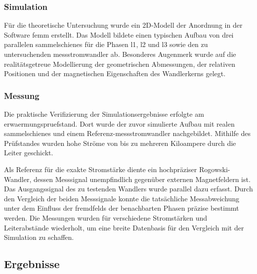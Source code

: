 \subsubsection{Simulation}
\label{sec:vorgehen:simulation}
Für die theoretische Untersuchung wurde ein 2D-Modell der Anordnung in der Software \gls{femm} erstellt. Das Modell bildete einen typischen Aufbau von drei parallelen \glspl{sammelschiene} für die Phasen \acrshort{l1}, \acrshort{l2} und \acrshort{l3} sowie den zu untersuchenden \gls{messstromwandler} ab. Besonderes Augenmerk wurde auf die realitätsgetreue Modellierung der geometrischen Abmessungen, der relativen Positionen und der magnetischen Eigenschaften des Wandlerkerns gelegt.


\subsubsection{Messung}
\label{sec:vorgehen:messung}
Die praktische Verifizierung der Simulationsergebnisse erfolgte am \gls{erwaermungspruefstand}. Dort wurde der zuvor simulierte Aufbau mit realen \glspl{sammelschiene} und einem Referenz-\gls{messstromwandler} nachgebildet. Mithilfe des Prüfstandes wurden hohe Ströme von bis zu mehreren Kiloampere durch die Leiter geschickt.

Als Referenz für die exakte Stromstärke diente ein hochpräziser Rogowski-Wandler, dessen Messsignal unempfindlich gegenüber externen Magnetfeldern ist. Das Ausgangssignal des zu testenden Wandlers wurde parallel dazu erfasst. Durch den Vergleich der beiden Messsignale konnte die tatsächliche Messabweichung unter dem Einfluss der \glspl{fremdfeld} der benachbarten Phasen präzise bestimmt werden. Die Messungen wurden für verschiedene Stromstärken und Leiterabstände wiederholt, um eine breite Datenbasis für den Vergleich mit der Simulation zu schaffen.


\subsection{Ergebnisse}
\label{sec:ergebnisse}
